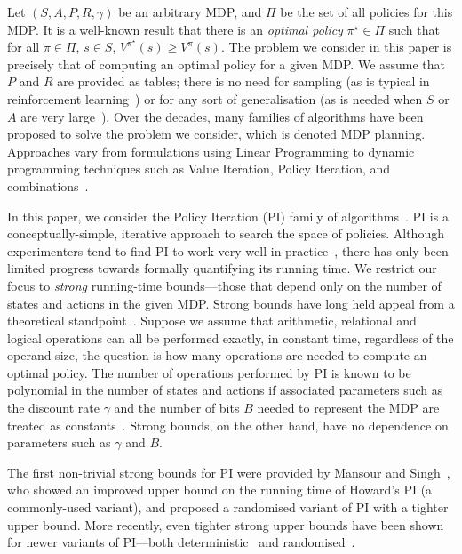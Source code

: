 Let $(S, A, P, R, \gamma)$ be an arbitrary MDP, and $\Pi$ be the set of all policies for this MDP. It is a well-known result that there is an \textit{optimal policy} $\pi^{\star} \in \Pi$ such that for all $\pi \in \Pi$, $s \in S$, $V^{\pi^{\star}}(s) \geq V^{\pi}(s)$. The problem we consider in this paper is precisely that of computing an optimal policy for a given MDP. We assume that $P$ and $R$ are provided as tables; there is no need for sampling (as is typical in reinforcement learning~\cite{Sutton+Barto:1998}) or for any sort of generalisation (as is needed when $S$ or $A$ are very large~\cite{Bertsekas+Tsitsiklis:1996}). Over the decades, many families of algorithms have been proposed to solve
the problem we consider, which is denoted MDP planning. Approaches vary from formulations using Linear Programming to dynamic programming techniques such as Value Iteration, Policy Iteration, and combinations~\cite{Littman+DK:1995}.

In this paper, we consider the Policy Iteration (PI) family of algorithms~\cite{Howard:1960}. PI is a conceptually-simple, iterative approach to search the space of policies. Although experimenters tend to find PI to work very well in practice~\cite[see Section 4.2]{Littman+DK:1995}, there has only been limited progress towards formally quantifying its running time. We restrict our focus to \textit{strong} running-time bounds---those that depend only on the number of states and actions in the given MDP. Strong bounds have long held appeal from a theoretical standpoint~\cite{Megiddo:1982}. Suppose we assume that arithmetic, relational and logical operations can all be performed exactly, in constant time, regardless of the operand size, the question is how many operations are needed to compute an optimal policy. The number of operations performed by PI is known to be polynomial in the number of states and actions if associated parameters such as the discount rate $\gamma$ and the number of bits $B$ needed to represent the MDP are treated as constants~\cite{Ye:2011,Scherrer:2013}. Strong bounds, on the other hand, have no dependence on parameters such as $\gamma$ and $B$.

The first non-trivial strong bounds for PI were provided by Mansour and Singh~, who showed an improved upper bound on the running time of Howard's PI (a commonly-used variant), and proposed a randomised variant of PI with a tighter upper bound. More recently, even tighter strong upper bounds have been shown for newer variants of PI---both deterministic~\cite{Kalyanakrishnan+Gupta} and randomised~\cite{Kalyanakrishnan+MG:2016}.

